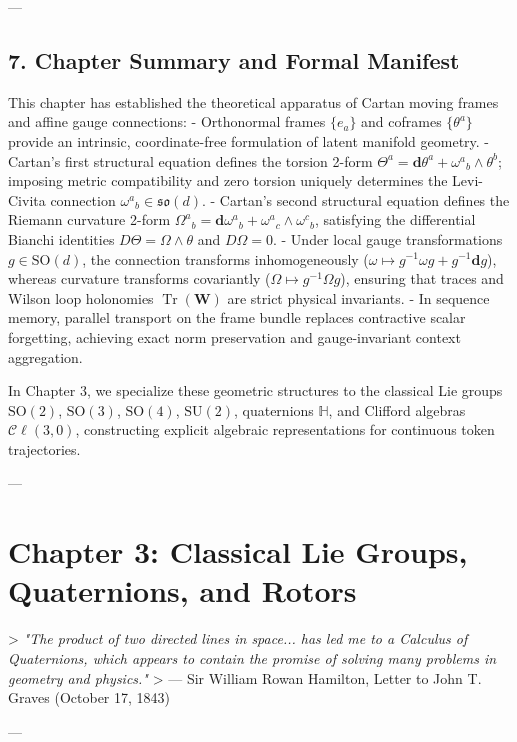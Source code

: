 \documentclass[11pt,twoside,openright]{amsbook}
\begin{document}
{{{{{{---

\section{7. Chapter Summary and Formal Manifest}

This chapter has established the theoretical apparatus of Cartan moving frames and affine gauge connections:
- Orthonormal frames $\{e_a\}$ and coframes $\{\theta^a\}$ provide an intrinsic, coordinate-free formulation of latent manifold geometry.
- Cartan's first structural equation defines the torsion 2-form $\Theta^a = \mathbf{d}\theta^a + \omega^a{}_b \wedge \theta^b$; imposing metric compatibility and zero torsion uniquely determines the Levi-Civita connection $\omega^a{}_b \in \mathfrak{so}(d)$.
- Cartan's second structural equation defines the Riemann curvature 2-form $\Omega^a{}_b = \mathbf{d}\omega^a{}_b + \omega^a{}_c \wedge \omega^c{}_b$, satisfying the differential Bianchi identities $D\Theta = \Omega \wedge \theta$ and $D\Omega = 0$.
- Under local gauge transformations $g \in \mathrm{SO}(d)$, the connection transforms inhomogeneously ($\omega \mapsto g^{-1}\omega g + g^{-1}\mathbf{d}g$), whereas curvature transforms covariantly ($\Omega \mapsto g^{-1}\Omega g$), ensuring that traces and Wilson loop holonomies $\operatorname{Tr}(\mathbf{W})$ are strict physical invariants.
- In sequence memory, parallel transport on the frame bundle replaces contractive scalar forgetting, achieving exact norm preservation and gauge-invariant context aggregation.

In Chapter 3, we specialize these geometric structures to the classical Lie groups $\mathrm{SO}(2)$, $\mathrm{SO}(3)$, $\mathrm{SO}(4)$, $\mathrm{SU}(2)$, quaternions $\mathbb{H}$, and Clifford algebras $\mathcal{C}\ell(3,0)$, constructing explicit algebraic representations for continuous token trajectories.


---

\chapter{Chapter 3: Classical Lie Groups, Quaternions, and Rotors}

> \textit{"The product of two directed lines in space... has led me to a Calculus of Quaternions, which appears to contain the promise of solving many problems in geometry and physics."}  
> — Sir William Rowan Hamilton, Letter to John T. Graves (October 17, 1843)

---

}}}}}}
\end{document}
